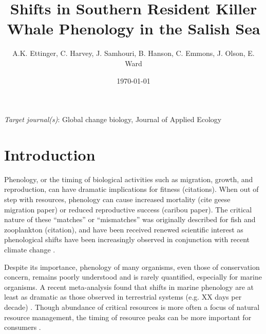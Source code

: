 \documentclass{article}
\begin{document}

\title{Shifts in Southern Resident Killer Whale Phenology in the Salish Sea}
\date{\today}
\maketitle
\author{A.K. Ettinger, C. Harvey, J. Samhouri, B. Hanson, C. Emmons, J. Olson, E. Ward}
\maketitle  %
\par 
\emph{Target journal(s)}: Global change biology, Journal of Applied Ecology %
\section* {Introduction}
\par Phenology, or the timing of biological activities such as migration, growth, and reproduction, can have dramatic implications for fitness (citations). When out of step with resources, phenology can cause increased mortality (cite geese migration paper) or reduced reproductive success (caribou paper). The critical nature of these ``matches'' or  ``mismatches'' was originally described for fish and zooplankton (citation), and have been received renewed scientific interest as phenological shifts have been increasingly observed in conjunction with recent climate change \citep{durant2007}. 

\par Despite its importance, phenology of many organisms, even those of conservation concern, remains poorly understood and is rarely quantified, especially for marine organisms. A recent meta-analysis found that shifts in marine phenology are at least as dramatic as those observed in terrestrial systems (e.g. XX days per decade) \citep{poloczanska2013}. Though abundance of critical resources is more often a focus of natural resource management, the timing of resource peaks can be more important for consumers \citep{hipfner2008}.
 
\end{document}
